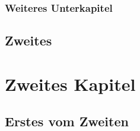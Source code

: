 \newpage
\begin{table}
    \centering
\end{table}

\subsection{Weiteres Unterkapitel}       %
\section{Zweites}
\newpage
\chapter{Zweites Kapitel}
\section{Erstes vom Zweiten}

\newpage